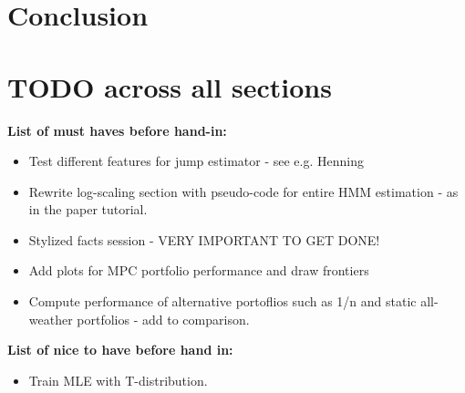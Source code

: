\newpage

\section{Conclusion}


\section{TODO across all sections}


\textbf{List of must haves before hand-in:}

\begin{itemize}
    \item Test different features for jump estimator - see e.g. Henning
    \item Rewrite log-scaling section with pseudo-code for entire HMM estimation - as in the paper tutorial.
    \item Stylized facts session - VERY IMPORTANT TO GET DONE!
    \item Add plots for MPC portfolio performance and draw frontiers
    \item Compute performance of alternative portoflios such as 1/n and static all-weather portfolios - add to comparison.
\end{itemize}



\textbf{List of nice to have before hand in:}

\begin{itemize}
    \item Train MLE with T-distribution.
\end{itemize}